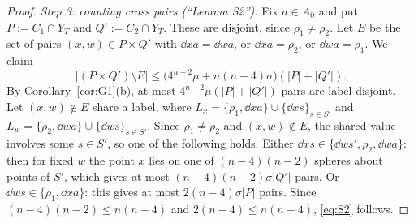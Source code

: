 \begin{proof}
\emph{Step 3: counting cross pairs (``Lemma S2'').} Fix $a\in A_0$ and put $P:=C_1\cap Y_T$ and $Q':=C_2\cap Y_T$. These
are disjoint, since $\rho_1\ne\rho_2$. Let $E$ be the set of pairs $(x,w)\in P\times Q'$ with $\dd xa=\dd wa$, or
$\dd xa=\rho_2$, or $\dd wa=\rho_1$. We claim
\begin{equation}\label{eq:S2}
|(P\times Q')\setminus E|\le\bigl(4^{n-2}\mu+n(n-4)\sigma\bigr)(|P|+|Q'|).
\end{equation}
By Corollary~\ref{cor:G1}(b), at most $4^{n-2}\mu(|P|+|Q'|)$ pairs are label-disjoint. Let $(x,w)\notin E$ share a
label, where $L_x=\{\rho_1,\dd xa\}\cup\{\dd xs\}_{s\in S'}$ and $L_w=\{\rho_2,\dd wa\}\cup\{\dd ws\}_{s\in S'}$.
Since $\rho_1\ne\rho_2$ and $(x,w)\notin E$, the shared value involves some $s\in S'$, so one of the following
holds. Either $\dd xs\in\{\dd w{s'},\rho_2,\dd wa\}$: then for fixed $w$ the point $x$ lies on one of $(n-4)(n-2)$
spheres about points of $S'$, which gives at most $(n-4)(n-2)\sigma|Q'|$ pairs. Or $\dd ws\in\{\rho_1,\dd xa\}$:
this gives at most $2(n-4)\sigma|P|$ pairs. Since $(n-4)(n-2)\le n(n-4)$ and $2(n-4)\le n(n-4)$, \eqref{eq:S2}
follows.


\end{proof}
